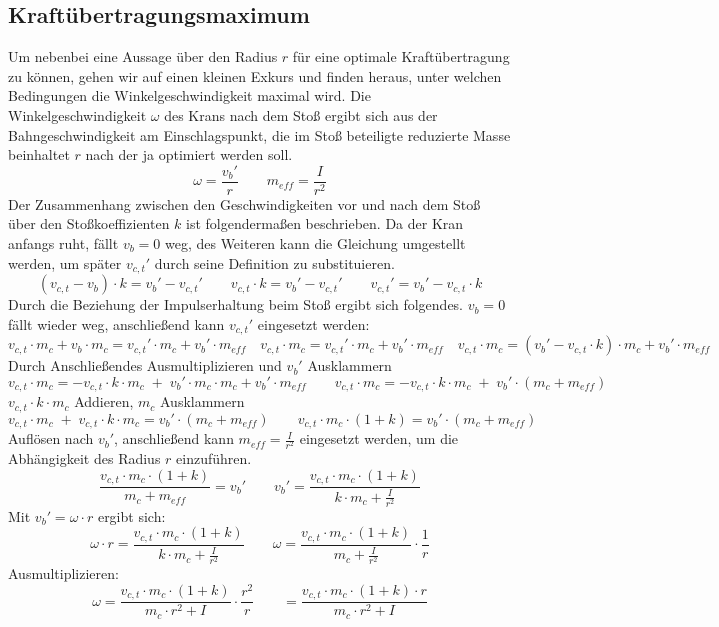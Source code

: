 \subsection{Kraftübertragungsmaximum} %
Um nebenbei eine Aussage über den Radius $r$ für eine optimale Kraftübertragung zu können, gehen wir auf einen kleinen Exkurs und finden heraus, unter welchen Bedingungen die Winkelgeschwindigkeit maximal wird. 
Die Winkelgeschwindigkeit $\omega$ des Krans nach dem Stoß ergibt sich aus der Bahngeschwindigkeit am Einschlagspunkt, die im Stoß beteiligte reduzierte Masse beinhaltet $r$ nach der ja optimiert werden soll.
\[
\omega = \frac{v_b'}{r} \qquad m_{eff} = \frac{I}{r^2}
\]
Der Zusammenhang zwischen den Geschwindigkeiten vor und nach dem Stoß über den Stoßkoeffizienten $k$ ist folgendermaßen beschrieben. Da der Kran anfangs ruht, fällt $v_b = 0$ weg, des Weiteren kann die Gleichung umgestellt werden, um später $v_{c,t}'$ durch seine Definition zu substituieren.
\[
\left(v_{c,t} - v_b\right) \cdot k = v_b' - v_{c,t}' \qquad v_{c,t} \cdot k = v_b'-v_{c,t}' \qquad v_{c,t}' = v_b'- v_{c,t} \cdot k
\]
Durch die Beziehung der Impulserhaltung beim Stoß ergibt sich folgendes. $v_b = 0$ fällt wieder weg, anschließend kann $v_{c,t}'$ eingesetzt werden:
\[
v_{c,t} \cdot m_c + v_b \cdot m_c = v_{c,t}' \cdot m_c + v_b' \cdot m_{eff} \quad v_{c,t} \cdot m_c = v_{c,t}' \cdot m_c + v_b' \cdot m_{eff} \quad v_{c,t} \cdot m_c =\left(v_b'- v_{c,t} \cdot k \right)  \cdot m_c + v_b' \cdot m_{eff}
\]
Durch Anschließendes Ausmultiplizieren und $v_b'$ Ausklammern
\[
v_{c,t} \cdot m_c = - v_{c,t} \cdot k \cdot m_c \; + \; v_b'\cdot m_c \cdot m_c + v_b' \cdot m_{eff} \qquad v_{c,t} \cdot m_c = - v_{c,t} \cdot k \cdot m_c \; + \; v_b'\cdot \left( m_c + m_{eff}\right)
\]
$v_{c,t} \cdot k \cdot m_c$ Addieren, $m_c$ Ausklammern
\[
v_{c,t} \cdot m_c \; + \; v_{c,t} \cdot k \cdot m_c = v_b'\cdot \left( m_c + m_{eff}\right) \qquad v_{c,t} \cdot m_c \cdot \left(1+k\right) = v_b'\cdot \left( m_c + m_{eff}\right)
\]
Auflösen nach $v_b'$, anschließend kann $m_{eff} = \frac{I}{r^2}$ eingesetzt werden, um die Abhängigkeit des Radius $r$ einzuführen.
\[
\frac{v_{c,t} \cdot m_c \cdot \left(1+k\right)}{ m_c + m_{eff}} = v_b' \qquad v_b' = \frac{v_{c,t} \cdot m_c \cdot (1 + k)}{k \cdot m_c + \frac{I}{r^2}}
\]
Mit $v_b' = \omega\cdot r$ ergibt sich:
\[
\omega\cdot r = \frac{v_{c,t} \cdot m_c \cdot (1 + k)}{k \cdot m_c + \frac{I}{r^2}} \qquad \omega= \frac{v_{c,t} \cdot m_c \cdot (1 + k)}{m_c + \frac{I}{r^2}}\cdot \frac{1}{r}
\]
Ausmultiplizieren:
\[
\omega= \frac{v_{c,t} \cdot m_c \cdot (1 + k)}{m_c \cdot r^2 + I}\cdot \frac{r^2}{r} \qquad = \frac{v_{c,t} \cdot m_c \cdot (1 + k)\cdot r}{m_c \cdot r^2 + I}
\]
